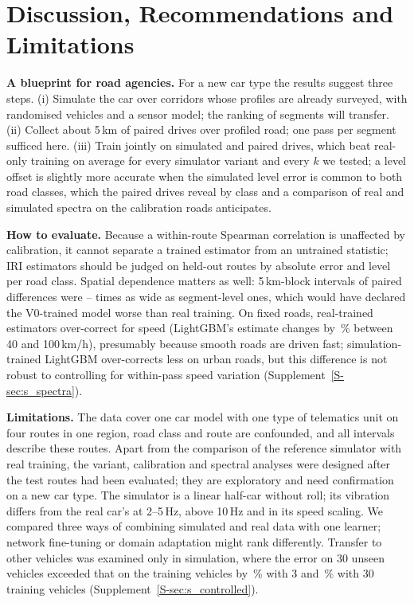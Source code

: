 \section{Discussion, Recommendations and Limitations}
\label{sec:discussion}

\textbf{A blueprint for road agencies.}
For a new car type the results suggest three steps.
(i) Simulate the car over corridors whose profiles are already surveyed, with randomised vehicles and a sensor model; the ranking of segments will transfer.
(ii) Collect about 5\,km of paired drives over profiled road; one pass per segment sufficed here.
(iii) Train jointly on simulated and paired drives, which beat real-only training on average for every simulator variant and every $k$ we tested; a level offset is slightly more accurate when the simulated level error is common to both road classes, which the paired drives reveal by class and a comparison of real and simulated spectra on the calibration roads anticipates.

\textbf{How to evaluate.}
Because a within-route Spearman correlation is unaffected by calibration, it cannot separate a trained estimator from an untrained statistic; IRI estimators should be judged on held-out routes by absolute error and level per road class.
Spatial dependence matters as well: 5\,km-block intervals of paired differences were \infWidthRatioMin--\infWidthRatioMax{} times as wide as segment-level ones, which would have declared the V0-trained model worse than real training.
On fixed roads, real-trained estimators over-correct for speed (LightGBM's estimate changes by \elRealGbmPooledPct\,\% between 40 and 100\,km/h), presumably because smooth roads are driven fast; simulation-trained LightGBM over-corrects less on urban roads, but this difference is not robust to controlling for within-pass speed variation (Supplement~\ref{S-sec:s_spectra}).

\textbf{Limitations.}
The data cover one car model with one type of telematics unit on four routes in one region, road class and route are confounded, and all intervals describe these routes.
Apart from the comparison of the reference simulator with real training, the variant, calibration and spectral analyses were designed after the test routes had been evaluated; they are exploratory and need confirmation on a new car type.
The simulator is a linear half-car without roll; its vibration differs from the real car's at 2--5\,Hz, above 10\,Hz and in its speed scaling.
We compared three ways of combining simulated and real data with one learner; network fine-tuning or domain adaptation might rank differently.
Transfer to other vehicles was examined only in simulation, where the error on 30 unseen vehicles exceeded that on the training vehicles by \vsThreeRel\,\% with 3 and \vsThirtyRel\,\% with 30 training vehicles (Supplement~\ref{S-sec:s_controlled}).
